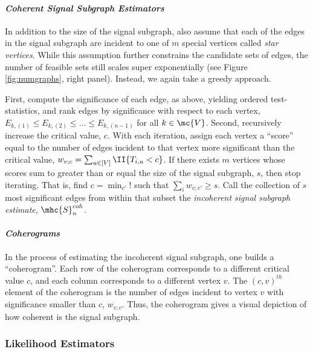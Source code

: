 \documentclass[10pt,journal,cspaper,compsoc]{IEEEtran}
\begin{document}
\paragraph{\emph{Coherent Signal Subgraph Estimators}}

In addition to the size of the signal subgraph, also assume that each of the edges in the signal subgraph are incident to one of $m$ special vertices called \emph{star vertices}. While this assumption further constrains the candidate sets of edges, the number of feasible sets still scales super exponentially (see Figure \ref{fig:numgraphs}, right panel).  Instead, we again take a greedy approach.  

First, compute the significance of each edge, as above, yielding ordered test-statistics, and rank edges by significance with respect to each vertex,  $E_{k,(1)} \leq E_{k,(2)} \leq \ldots \leq E_{k,(n-1)}$ for all $k \in \mc{V}$.  Second, recursively increase the critical value, $c$. With each iteration, assign each vertex a ``score'' equal to the number of edges incident to that vertex more significant than the critical value, $w_{v;c}=\sum_{u \in [V]} \II\{T_{i,u} < c\}$.  If there exists $m$ vertices whose scores sum to greater than or equal the size of the signal subgraph, $s$, then stop iterating.  That is, find $c=\min_{c'} !$ such that $\sum_{i} w_{v;c'}\geq s$.  Call the collection of $s$ most significant edges from within that subset the \emph{incoherent signal subgraph estimate}, $\mhc{S}^{coh}_n$. %

\paragraph{\emph{Coherograms}}

In the process of estimating the incoherent signal subgraph, one builds a ``coherogram''.  Each row of the coherogram corresponds to a different critical value $c$, and each column corresponds to a different vertex $v$.  The $(c,v)^{th}$ element of the coherogram is the number of edges incident to vertex $v$ with significance smaller than $c$, $w_{v;c}$.  Thus, the coherogram gives a visual depiction of how coherent is the signal subgraph.


\subsubsection{Likelihood Estimators} %
\label{sub:likelihood}
\end{document}
